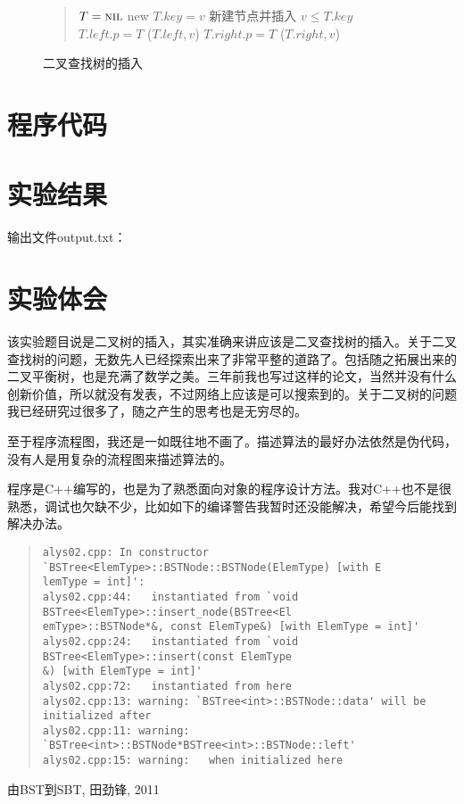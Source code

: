 \documentclass[cs4size,a4paper,nofonts]{ctexart}
\begin{document}
\begin{figure}[htp]
\begin{quote}
\begin{codebox}
\li \If $T=\textnormal{\scshape nil}$ \Then
\li   new $T.key = v$ \Comment 新建节点并插入
\li \ElseIf $v \le T.key$ \Then
\li   $T.left.p = T$
\li   {}($T.left, v$)
\li \Else
\li   $T.right.p = T$
\li   {}($T.right, v$)
    \End
\end{codebox}
\end{quote}
\caption{\label{BST-Insert}二叉查找树的插入}
\end{figure}

\section{程序代码}
{\linespread{1}}

\section{实验结果}
输出文件output.txt：
\begin{quote}

\end{quote}

\section{实验体会}
该实验题目说是二叉树的插入，其实准确来讲应该是二叉查找树的插入。关于二叉查找树的问题，无数先人已经探索出来了非常平整的道路了。包括随之拓展出来的二叉平衡树，也是充满了数学之美。三年前我也写过这样的论文，当然并没有什么创新价值，所以就没有发表，不过网络上应该是可以搜索到的。关于二叉树的问题我已经研究过很多了，随之产生的思考也是无穷尽的。

至于程序流程图，我还是一如既往地不画了。描述算法的最好办法依然是伪代码，没有人是用复杂的流程图来描述算法的。

程序是C++编写的，也是为了熟悉面向对象的程序设计方法。我对C++也不是很熟悉，调试也欠缺不少，比如如下的编译警告我暂时还没能解决，希望今后能找到解决办法。
\begin{quote}
\small
\begin{verbatim}
alys02.cpp: In constructor `BSTree<ElemType>::BSTNode::BSTNode(ElemType) [with E
lemType = int]':
alys02.cpp:44:   instantiated from `void BSTree<ElemType>::insert_node(BSTree<El
emType>::BSTNode*&, const ElemType&) [with ElemType = int]'
alys02.cpp:24:   instantiated from `void BSTree<ElemType>::insert(const ElemType
&) [with ElemType = int]'
alys02.cpp:72:   instantiated from here
alys02.cpp:13: warning: `BSTree<int>::BSTNode::data' will be initialized after
alys02.cpp:11: warning:   `BSTree<int>::BSTNode*BSTree<int>::BSTNode::left'
alys02.cpp:15: warning:   when initialized here
\end{verbatim}
\end{quote}


\begin{thebibliography}{10}
由BST到SBT, 田劲锋, 2011
\end{thebibliography}
\end{document}
